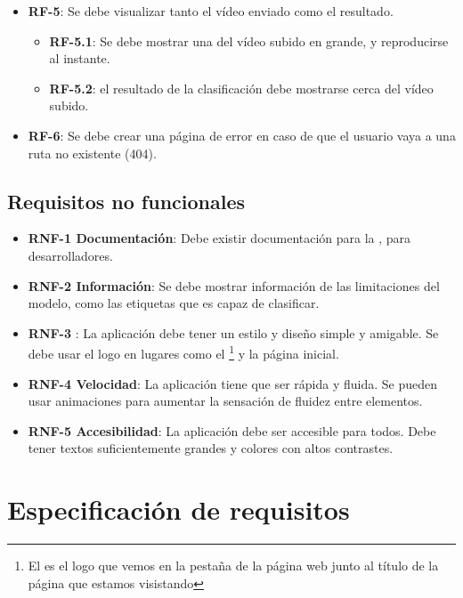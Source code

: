 \begin{itemize}
  \item \textbf{RF-5}: Se debe visualizar tanto el vídeo enviado como el resultado.
        \begin{itemize}
          \item \textbf{RF-5.1}: Se debe mostrar una  del vídeo subido en grande, y reproducirse al instante.
          \item \textbf{RF-5.2}: el resultado de la clasificación debe mostrarse cerca del vídeo subido.
        \end{itemize}

  \item \textbf{RF-6}: Se debe crear una página de error en caso de que el usuario vaya a una ruta no existente (404).

\end{itemize}

\subsection{Requisitos no funcionales}

\begin{itemize}
  \item \textbf{RNF-1 Documentación}: Debe existir documentación para la , para desarrolladores.
  \item \textbf{RNF-2 Información}: Se debe mostrar información de las limitaciones del modelo, como las etiquetas que es capaz de clasificar.
  \item \textbf{RNF-3 }: La aplicación debe tener un estilo y diseño simple y amigable. Se debe usar el logo en lugares como el  \footnote{El  es el logo que vemos en la pestaña de la página web junto al título de la página que estamos visistando} y la página inicial.
  \item \textbf{RNF-4 Velocidad}: La aplicación tiene que ser rápida y fluida. Se pueden usar animaciones para aumentar la sensación de fluidez entre elementos.
  \item \textbf{RNF-5 Accesibilidad}: La aplicación debe ser accesible para todos. Debe tener textos suficientemente grandes y colores con altos contrastes.
\end{itemize}

\section{Especificación de requisitos}

